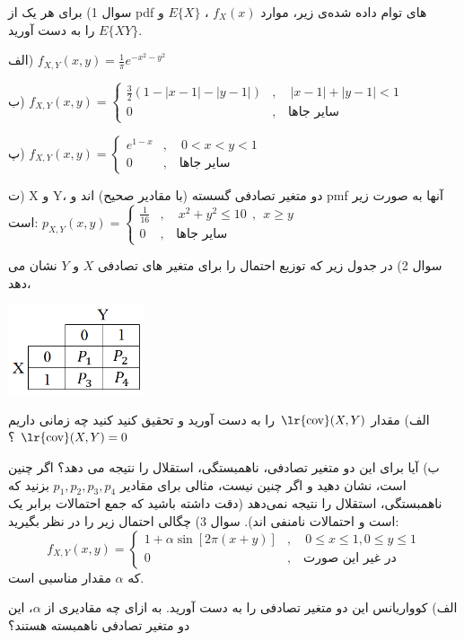 \documentclass[10pt,letterpaper]{article}
\begin{document}
سوال 1) برای هر یک از pdf های توام داده شده‌ی زیر، موارد 
$
f_X(x)
$
،
$
E\{X\}
$
و
$
E\{XY\}
$
را به دست آورید.

الف) 
$
f_{X,Y}(x,y)=\frac{1}{\pi}e^{-x^2-y^2}
$

ب) 
$
f_{X,Y}(x,y)=\begin{cases}
\frac{3}{2}(1-|x-1|-|y-1|)&,\quad |x-1|+|y-1|<1\\
0&,\quad \text{سایر جاها}
\end{cases}
$

پ)
$
f_{X,Y}(x,y)=\begin{cases}
e^{1-x}&,\quad 0<x<y<1\\
0&,\quad \text{سایر جاها}
\end{cases}
$

ت) X و Y، دو متغیر تصادفی گسسته (با مقادیر صحیح) اند و pmf آنها به صورت زیر است:
$
p_{X,Y}(x,y)=\begin{cases}
\frac{1}{16}&,\quad x^2+y^2\le 10 \ \ ,\ \ x\ge y\\
0&,\quad \text{سایر جاها}
\end{cases}
$

سوال 2) در جدول زیر که توزیع احتمال را برای متغیر های تصادفی $X$ و $Y$ نشان می دهد،
\begin{center}
\includegraphics[width=40mm]{Q2_HW8}
\end{center}
الف) مقدار 
$
\text{\lr{cov}}(X,Y)
$
 را به دست آورید و تحقیق کنید کنید چه زمانی داریم 
$
\text{\lr{cov}}(X,Y)=0
$
؟

ب) آیا برای این دو متغیر تصادفی، ناهمبستگی، استقلال را نتیجه می دهد؟ اگر چنین است، نشان دهید و اگر چنین نیست، مثالی برای مقادیر 
$
p_1,p_2,p_3,p_4
$
 بزنید که ناهمبستگی، استقلال را نتیجه نمی‌دهد (دقت داشته باشید که جمع احتمالات برابر یک است و احتمالات نامنفی اند).
\newline
\newline
سوال 3) چگالی احتمال زیر را در نظر بگیرید:
$$
f_{X,Y}(x,y)=\begin{cases}
1+\alpha\sin[2\pi(x+y)]&,\quad 0\le x\le1,0\le y\le1
\\0&,\quad \text{در غیر این صورت}
\end{cases}
$$
که $\alpha$ مقدار مناسبی است.

الف) کوواریانس این دو متغیر تصادفی را به دست آورید. به ازای چه مقادیری از $\alpha$، این دو متغیر تصادفی ناهمبسته هستند؟
\end{document}
